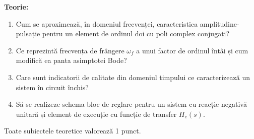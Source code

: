 \documentclass[11pt,a4paper]{article}
\begin{document}
\textbf{Teorie:}
\begin{enumerate}[leftmargin=1.4em]
\item Cum se aproximează, în domeniul frecvenței, caracteristica amplitudine-pulsație pentru un element de ordinul doi cu poli complex conjugați?
\item Ce reprezintă frecvența de frângere $\omega_f$ a unui factor de ordinul întâi și cum modifică ea panta asimptotei Bode?
\item Care sunt indicatorii de calitate din domeniul timpului ce caracterizează un sistem în circuit închis?
\item Să se realizeze schema bloc de reglare pentru un sistem cu reacție negativă unitară și element de execuție cu funcție de transfer $H_e(s)$.
\end{enumerate}

\vspace{0.2cm}
\small Toate subiectele teoretice valorează 1 punct.
\end{document}

